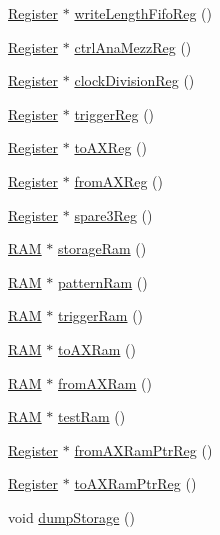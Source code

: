 \begin{DoxyCompactItemize}
\item 
\hyperlink{classRegister}{Register} $\ast$ \hyperlink{classA3PE_a3b75531731fc939206cce076f7ac9f9a}{write\+Length\+Fifo\+Reg} ()
\item 
\hyperlink{classRegister}{Register} $\ast$ \hyperlink{classA3PE_aa94c6120a73194d69dc5761cf90a4800}{ctrl\+Ana\+Mezz\+Reg} ()
\item 
\hyperlink{classRegister}{Register} $\ast$ \hyperlink{classA3PE_a10cf30ff852d7580ba94dbee0c48e0d5}{clock\+Division\+Reg} ()
\item 
\hyperlink{classRegister}{Register} $\ast$ \hyperlink{classA3PE_a4bf922f391fee6753fb0d53e133603b7}{trigger\+Reg} ()
\item 
\hyperlink{classRegister}{Register} $\ast$ \hyperlink{classA3PE_a43b0006fafa3aeae353abb2ac30e872c}{to\+A\+X\+Reg} ()
\item 
\hyperlink{classRegister}{Register} $\ast$ \hyperlink{classA3PE_a0b2fabe7e7941f33de210d9385b7afce}{from\+A\+X\+Reg} ()
\item 
\hyperlink{classRegister}{Register} $\ast$ \hyperlink{classA3PE_a979a9ac462eb55e611f6de4e94bad18e}{spare3\+Reg} ()
\item 
\hyperlink{classRAM}{R\+AM} $\ast$ \hyperlink{classA3PE_af241373059bad4a3c376ab2ac98a7b29}{storage\+Ram} ()
\item 
\hyperlink{classRAM}{R\+AM} $\ast$ \hyperlink{classA3PE_a94ef54086baa29f7f6638c13d8906e56}{pattern\+Ram} ()
\item 
\hyperlink{classRAM}{R\+AM} $\ast$ \hyperlink{classA3PE_aad0f7ac467db22e5608ae6b0957665a1}{trigger\+Ram} ()
\item 
\hyperlink{classRAM}{R\+AM} $\ast$ \hyperlink{classA3PE_a16b16ac12705b9dd93d70fa172deb584}{to\+A\+X\+Ram} ()
\item 
\hyperlink{classRAM}{R\+AM} $\ast$ \hyperlink{classA3PE_a7c9026a74c1954b2d250be05fbc1c8c5}{from\+A\+X\+Ram} ()
\item 
\hyperlink{classRAM}{R\+AM} $\ast$ \hyperlink{classA3PE_a9327d0bd2efb5baa7c6b7de27bbc5997}{test\+Ram} ()
\item 
\hyperlink{classRegister}{Register} $\ast$ \hyperlink{classA3PE_aad21357e25e3d4e2bed779040de52e13}{from\+A\+X\+Ram\+Ptr\+Reg} ()
\item 
\hyperlink{classRegister}{Register} $\ast$ \hyperlink{classA3PE_af6e9e980e871fcf0e1b35e1b4ae95ebe}{to\+A\+X\+Ram\+Ptr\+Reg} ()
\item 
void \hyperlink{classA3PE_ad7999557f9d561dec67526730a3c97ef}{dump\+Storage} ()
\item 

\end{DoxyCompactItemize}
